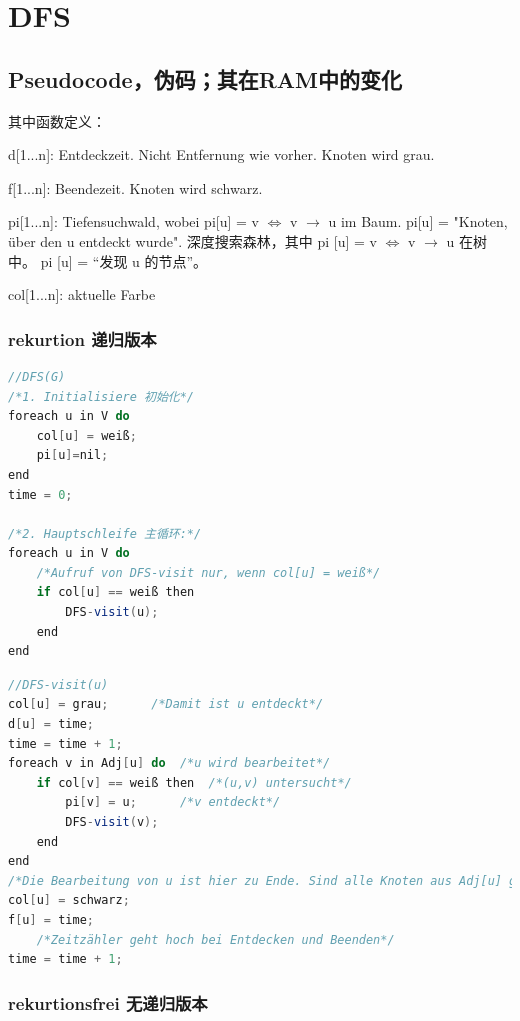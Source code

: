 \documentclass[a4paper]{article}    %
\begin{document}
\section{DFS}

\subsection{Pseudocode，伪码；其在RAM中的变化}

\noindent 其中函数定义：

d[1...n]: Entdeckzeit. Nicht Entfernung wie vorher. Knoten wird grau.

f[1...n]: Beendezeit. Knoten wird schwarz.

pi[1...n]: Tiefensuchwald, wobei pi[u] = v $\Leftrightarrow$ v $\rightarrow$ u im Baum. pi[u] = "Knoten, über den u entdeckt wurde".
深度搜索森林，其中 pi [u] = v $ \Leftrightarrow $ v $ \rightarrow $ u 在树中。 pi [u] = “发现 u 的节点”。

col[1...n]: aktuelle Farbe

\subsubsection{rekurtion 递归版本}

\begin{lstlisting}[language = java]
//DFS(G)
/*1. Initialisiere 初始化*/
foreach u in V do
    col[u] = weiß;
    pi[u]=nil;
end
time = 0;

/*2. Hauptschleife 主循环:*/
foreach u in V do
    /*Aufruf von DFS-visit nur, wenn col[u] = weiß*/
    if col[u] == weiß then
        DFS-visit(u);
    end
end
\end{lstlisting}

\begin{lstlisting}[language = java]
//DFS-visit(u)
col[u] = grau;      /*Damit ist u entdeckt*/
d[u] = time;
time = time + 1;
foreach v in Adj[u] do  /*u wird bearbeitet*/
    if col[v] == weiß then  /*(u,v) untersucht*/
        pi[v] = u;      /*v entdeckt*/
        DFS-visit(v);
    end
end
/*Die Bearbeitung von u ist hier zu Ende. Sind alle Knoten aus Adj[u] grau oder schwarz, so wird u direkt schwarz.*/
col[u] = schwarz;
f[u] = time;
    /*Zeitzähler geht hoch bei Entdecken und Beenden*/
time = time + 1;
\end{lstlisting}

\subsubsection{rekurtionsfrei 无递归版本}
\end{document}
